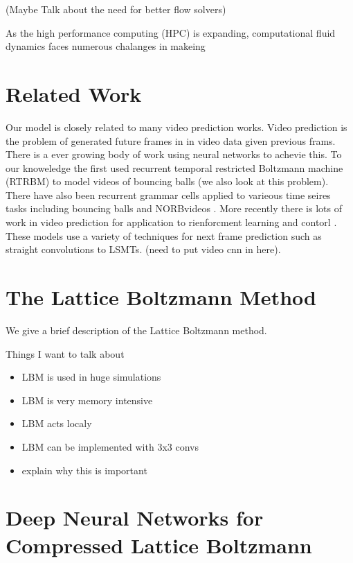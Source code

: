 \documentclass{article}
\begin{document}
(Maybe Talk about the need for better flow solvers)

As the high performance computing (HPC) is expanding, computational fluid dynamics faces numerous chalanges in makeing 


\section{Related Work}

Our model is closely related to many video prediction works. Video prediction is the problem of generated future frames in in video data given previous frams. There is a ever growing body of work using neural networks to achevie this. To our knoweledge the first used recurrent temporal restricted Boltzmann machine (RTRBM) \cite{sutskever2009recurrent} to model videos of bouncing balls (we also look at this problem). There have also been recurrent grammar cells applied to varieous time seires tasks including bouncing balls and NORBvideos \cite{michalshi2014modeling} \cite{memisevic2013learning}. More recently there is lots of work in video prediction for application to rienforcment learning and contorl \cite{oh2015action} \cite{santana2016learning} \cite{fragkiadaki2015learning} \cite{watter2015embed}. These models use a variety of techniques for next frame prediction such as straight convolutions \cite{fragkiadaki2015learning} to LSMTs. (need to put video cnn in here).

\section{The Lattice Boltzmann Method}

We give a brief description of the Lattice Boltzmann method.

Things I want to talk about

\begin{itemize}
  \item LBM is used in huge simulations
  \item LBM is very memory intensive
  \item LBM acts localy
  \item LBM can be implemented with 3x3 convs
  \item explain why this is important
\end{itemize}


\section{Deep Neural Networks for Compressed Lattice Boltzmann}
\end{document}

